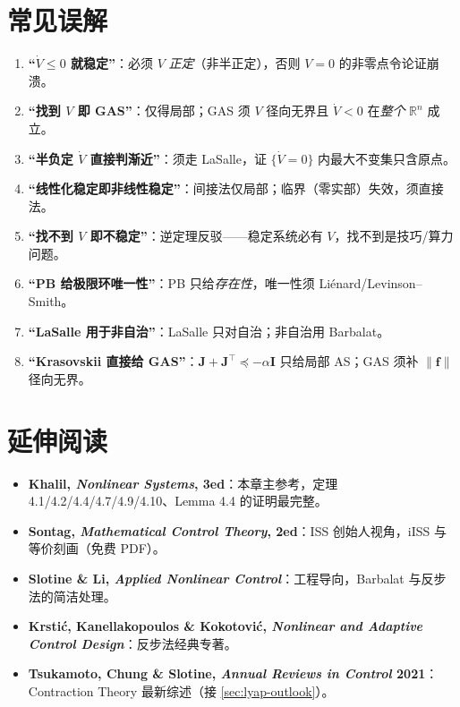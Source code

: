\section*{常见误解}
\begin{enumerate}
  \item \textbf{“$\dot V\le0$ 就稳定”}：必须 $V$ \emph{正定}（非半正定），否则 $V=0$ 的非零点令论证崩溃。
  \item \textbf{“找到 $V$ 即 GAS”}：仅得局部；GAS 须 $V$ 径向无界且 $\dot V<0$ 在\emph{整个} $\mathbb{R}^n$ 成立。
  \item \textbf{“半负定 $\dot V$ 直接判渐近”}：须走 LaSalle，证 $\{\dot V=0\}$ 内最大不变集只含原点。
  \item \textbf{“线性化稳定即非线性稳定”}：间接法仅局部；临界（零实部）失效，须直接法。
  \item \textbf{“找不到 $V$ 即不稳定”}：逆定理反驳——稳定系统必有 $V$，找不到是技巧/算力问题。
  \item \textbf{“PB 给极限环唯一性”}：PB 只给\emph{存在性}，唯一性须 Liénard/Levinson–Smith。
  \item \textbf{“LaSalle 用于非自治”}：LaSalle 只对自治；非自治用 Barbalat。
  \item \textbf{“Krasovskii 直接给 GAS”}：$\mathbf{J}+\mathbf{J}^\top\preceq-\alpha\mathbf{I}$ 只给局部 AS；GAS 须补 $\|\mathbf{f}\|$ 径向无界。
\end{enumerate}

\section*{延伸阅读}
\begin{itemize}
  \item \textbf{Khalil, \emph{Nonlinear Systems}, 3ed}\cite{khalil2002nonlinear}：本章主参考，定理 4.1/4.2/4.4/4.7/4.9/4.10、Lemma 4.4 的证明最完整。
  \item \textbf{Sontag, \emph{Mathematical Control Theory}, 2ed}\cite{sontag1998mathematical}：ISS 创始人视角，iISS 与等价刻画（免费 PDF）。
  \item \textbf{Slotine \& Li, \emph{Applied Nonlinear Control}}\cite{slotine1991applied}：工程导向，Barbalat 与反步法的简洁处理。
  \item \textbf{Krstić, Kanellakopoulos \& Kokotović, \emph{Nonlinear and Adaptive Control Design}}\cite{krstic1995nonlinear}：反步法经典专著。
  \item \textbf{Tsukamoto, Chung \& Slotine, \emph{Annual Reviews in Control} 2021}\cite{tsukamoto2021contraction}：Contraction Theory 最新综述（接 \cref{sec:lyap-outlook}）。
\end{itemize}
